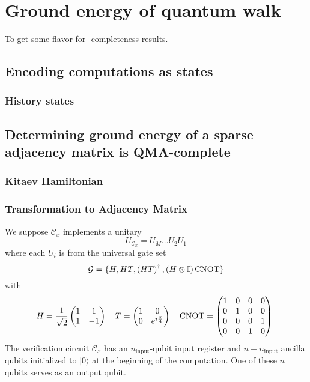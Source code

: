 \documentclass[../thesis-main/thesis-main]{subfiles}
\begin{document}
\chapter{Ground energy of quantum walk}

To get some flavor for \QMA-completeness results.

\section{Encoding computations as states}

\subsection{History states}

\section{Determining ground energy of a sparse adjacency matrix is QMA-complete}

\subsection{Kitaev Hamiltonian}

\subsection{Transformation to Adjacency Matrix}

We suppose $\mathcal{C}_{x}$ implements a unitary 
\begin{equation}
U_{\mathcal{C}_{x}}=U_{M}\ldots U_{2}U_{1}\label{eq:single_qubit_circuit}
\end{equation}
 where each $U_{i}$ is from the universal gate set 
\[
\mathcal{G}=\{H,HT,\left(HT\right)^{\dagger},\left(H\otimes\mathbb{I}\right)\mathrm{CNOT}\}
\]
with 
\[
H=\frac{1}{\sqrt{2}}\begin{pmatrix}
1 & 1\\
1 & -1
\end{pmatrix} \quad T=\begin{pmatrix}
1 & 0\\
0 & e^{i\frac{\pi}{4}}
\end{pmatrix}\quad\mathrm{CNOT}=\begin{pmatrix}
1 & 0 & 0 & 0\\
0 & 1 & 0 & 0\\
0 & 0 & 0 & 1\\
0 & 0 & 1 & 0
\end{pmatrix}.
\]
The verification circuit $\mathcal{C}_{x}$ has an $n_{\text{input}}$-qubit input register and $n-n_{\text{input}}$ ancilla qubits initialized to $|0\rangle$ at the beginning of the computation. One of these $n$ qubits serves as an output qubit.
\end{document}
